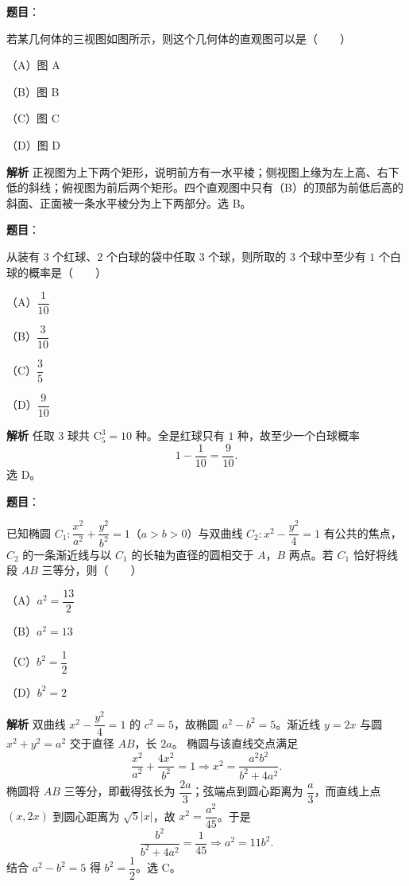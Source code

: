 \begin{answer}

\textbf{题目}：

若某几何体的三视图如图所示，则这个几何体的直观图可以是\mbox{（　　）}

（A）图 A

（B）图 B

（C）图 C

（D）图 D
\nopagebreak[4]
\begin{center}\end{center}
\nopagebreak[4]
\textbf{解析}
正视图为上下两个矩形，说明前方有一水平棱；侧视图上缘为左上高、右下低的斜线；俯视图为前后两个矩形。四个直观图中只有（B）的顶部为前低后高的斜面、正面被一条水平棱分为上下两部分。选 B。


\end{answer}
\begin{answer}

\textbf{题目}：

从装有 $3$ 个红球、$2$ 个白球的袋中任取 $3$ 个球，则所取的 $3$ 个球中至少有 $1$ 个白球的概率是\mbox{（　　）}

（A）$\dfrac1{10}$

（B）$\dfrac3{10}$

（C）$\dfrac35$

（D）$\dfrac9{10}$

\textbf{解析}
任取 $3$ 球共 $\mathrm C_5^3=10$ 种。全是红球只有 $1$ 种，故至少一个白球概率
\nopagebreak[4]
\[1-\frac1{10}=\frac9{10}.\]
选 D。


\end{answer}
\begin{answer}

\textbf{题目}：

已知椭圆 $C_1:\dfrac{x^2}{a^2}+\dfrac{y^2}{b^2}=1$（$a>b>0$）与双曲线 $C_2:x^2-\dfrac{y^2}4=1$ 有公共的焦点，$C_2$ 的一条渐近线与以 $C_1$ 的长轴为直径的圆相交于 $A$，$B$ 两点。若 $C_1$ 恰好将线段 $AB$ 三等分，则\mbox{（　　）}

（A）$a^2=\dfrac{13}2$

（B）$a^2=13$

（C）$b^2=\dfrac12$

（D）$b^2=2$

\textbf{解析}
双曲线 $x^2-\dfrac{y^2}4=1$ 的 $c^2=5$，故椭圆 $a^2-b^2=5$。渐近线 $y=2x$ 与圆 $x^2+y^2=a^2$ 交于直径 $AB$，长 $2a$。
椭圆与该直线交点满足
\nopagebreak[4]
\[\frac{x^2}{a^2}+\frac{4x^2}{b^2}=1\Longrightarrow x^2=\frac{a^2b^2}{b^2+4a^2}.\]
椭圆将 $AB$ 三等分，即截得弦长为 $\dfrac{2a}3$；弦端点到圆心距离为 $\dfrac a3$，而直线上点 $(x,2x)$ 到圆心距离为 $\sqrt5|x|$，故 $x^2=\dfrac{a^2}{45}$。于是
\nopagebreak[4]
\[\frac{b^2}{b^2+4a^2}=\frac1{45}\Longrightarrow a^2=11b^2.\]
结合 $a^2-b^2=5$ 得 $b^2=\dfrac12$。选 C。


\end{answer}
